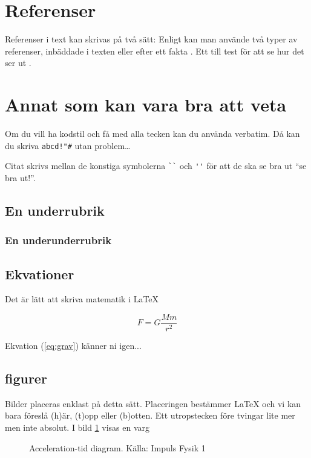 \documentclass[11p]{article}
\begin{document}

    \section{Referenser}
    Referenser i text kan skrivas på två sätt: Enligt \textcite{Jens}
    kan man använde två typer av referenser, inbäddade i texten eller
    efter ett fakta \parencite{Fraenkel}. Ett till test för att se hur
    det ser ut \parencite[sid 55]{fermi}.

    \section{Annat som kan vara bra att veta}
    Om du vill ha kodstil och få med alla tecken kan du använda verbatim.
    Då kan du skriva \verb|abcd!"#| utan problem\ldots

    Citat skrivs mellan de konstiga symbolerna \verb|``| och \verb|''|
    för att de ska se bra ut ``se bra ut!''.
    \subsection{En underrubrik}
    \subsubsection{En underunderrubrik}
    \subsection{Ekvationer}
    Det är lätt att skriva matematik i \LaTeX

    \begin{equation}
        F = G \frac{M m}{r^2}
        \label{eq:grav}
    \end{equation}

    Ekvation (\ref{eq:grav}) känner ni igen...

    \subsection{figurer}
    Bilder placeras enklast på detta sätt. Placeringen bestämmer \LaTeX
    och vi kan bara föreslå (h)är, (t)opp eller (b)otten. Ett utropstecken
    före tvingar lite mer men inte absolut. I bild \ref{varg} visas en varg
    \begin{figure}[!h]
        \caption{Acceleration-tid diagram. Källa: Impuls Fysik 1}
        \label{varg}
    \end{figure}
    \printbibliography
\end{document}
